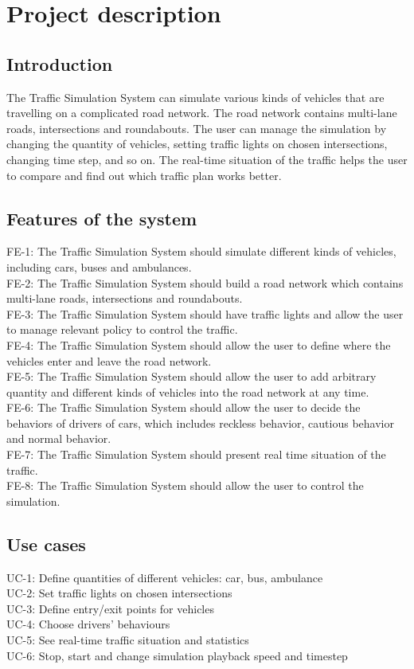 \documentclass[a4paper,12pt]{article}
\begin{document}
\section{Project description}

\subsection{Introduction}
The Traffic Simulation System can simulate various kinds of vehicles that are travelling on a complicated road network. The road network contains multi-lane roads, intersections and roundabouts. The user can manage the simulation by changing the quantity of vehicles, setting traffic lights on chosen intersections, changing time step, and so on. The real-time situation of the traffic helps the user to compare and find out which traffic plan works better.

\subsection{Features of the system}
FE-1: The Traffic Simulation System should simulate different kinds of vehicles, including cars, buses and ambulances.\\
FE-2: The Traffic Simulation System should build a road network which contains multi-lane roads, intersections and roundabouts.\\
FE-3: The Traffic Simulation System should have traffic lights and allow the user to manage relevant policy to control the traffic.\\
FE-4: The Traffic Simulation System should allow the user to define where the vehicles enter and leave the road network.\\
FE-5: The Traffic Simulation System should allow the user to add arbitrary quantity and different kinds of vehicles into the road network at any time.\\
FE-6: The Traffic Simulation System should allow the user to decide the behaviors of drivers of cars, which includes reckless behavior, cautious behavior and normal behavior.\\
FE-7: The Traffic Simulation System should present real time situation of the traffic.\\
FE-8: The Traffic Simulation System should allow the user to control the simulation.


\subsection{Use cases}
UC-1: Define quantities of different vehicles: car, bus, ambulance\\
UC-2: Set traffic lights on chosen intersections\\
UC-3: Define entry/exit points for vehicles\\
UC-4: Choose drivers' behaviours\\
UC-5: See real-time traffic situation and statistics\\
UC-6: Stop, start and change simulation playback speed and timestep
\end{document}
